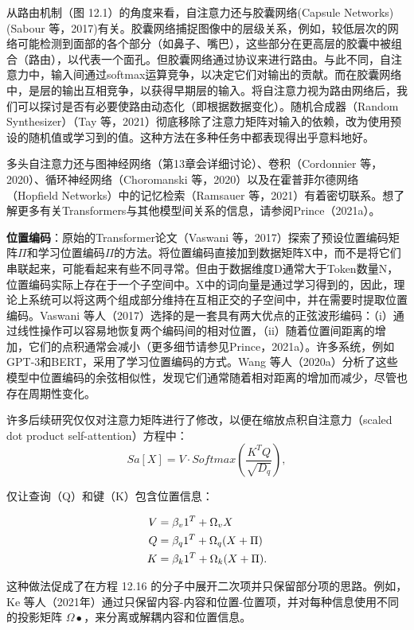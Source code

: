 \documentclass[lang=cn,newtx,10pt,scheme=chinese]{elegantbook}
\begin{document}
从路由机制（图 12.1）的角度来看，自注意力还与胶囊网络(Capsule Networks)
(Sabour 等，2017)有关。胶囊网络捕捉图像中的层级关系，例如，较低层次的网络可能检测到面部的各个部分（如鼻子、嘴巴），这些部分在更高层的胶囊中被组合（路由），以代表一个面孔。但胶囊网络通过协议来进行路由。与此不同，自注意力中，输入间通过softmax运算竞争，以决定它们对输出的贡献。而在胶囊网络中，是层的输出互相竞争，以获得早期层的输入。将自注意力视为路由网络后，我们可以探讨是否有必要使路由动态化（即根据数据变化）。随机合成器（Random Synthesizer）（Tay 等，2021）彻底移除了注意力矩阵对输入的依赖，改为使用预设的随机值或学习到的值。这种方法在多种任务中都表现得出乎意料地好。

多头自注意力还与图神经网络（第13章会详细讨论）、卷积（Cordonnier 等，2020）、循环神经网络（Choromanski 等，2020）以及在霍普菲尔德网络（Hopfield Networks）中的记忆检索（Ramsauer 等，2021）有着密切联系。想了解更多有关Transformers与其他模型间关系的信息，请参阅Prince（2021a）。

\textbf{位置编码}：原始的Transformer论文（Vaswani 等，2017）探索了预设位置编码矩阵\(\Pi\)和学习位置编码\(\Pi\)的方法。将位置编码直接加到数据矩阵X中，而不是将它们串联起来，可能看起来有些不同寻常。但由于数据维度D通常大于Token数量N，位置编码实际上存在于一个子空间中。X中的词向量是通过学习得到的，因此，理论上系统可以将这两个组成部分维持在互相正交的子空间中，并在需要时提取位置编码。Vaswani 等人（2017）选择的是一套具有两大优点的正弦波形编码：（i）通过线性操作可以容易地恢复两个编码间的相对位置，（ii）随着位置间距离的增加，它们的点积通常会减小（更多细节请参见Prince，2021a）。许多系统，例如GPT-3和BERT，采用了学习位置编码的方式。Wang 等人（2020a）分析了这些模型中位置编码的余弦相似性，发现它们通常随着相对距离的增加而减少，尽管也存在周期性变化。

许多后续研究仅仅对注意力矩阵进行了修改，以便在缩放点积自注意力（scaled dot product self-attention）方程中：
\begin{equation}
Sa[X] = V \cdot Softmax\left( \frac{K^TQ}{\sqrt{D_q}} \right),  
\end{equation}

仅让查询（Q）和键（K）包含位置信息：


\begin{align}
V &= \beta_v 1^T + \Omega_v X \notag \\
Q &= \beta_q 1^T + \Omega_q (X + \Pi) \notag \\
K &= \beta_k 1^T + \Omega_k (X + \Pi). 
\end{align} 

这种做法促成了在方程 12.16 的分子中展开二次项并只保留部分项的思路。例如，Ke 等人（2021年）通过只保留内容-内容和位置-位置项，并对每种信息使用不同的投影矩阵 \(\Omega •\)，来分离或解耦内容和位置信息。
\end{document}
